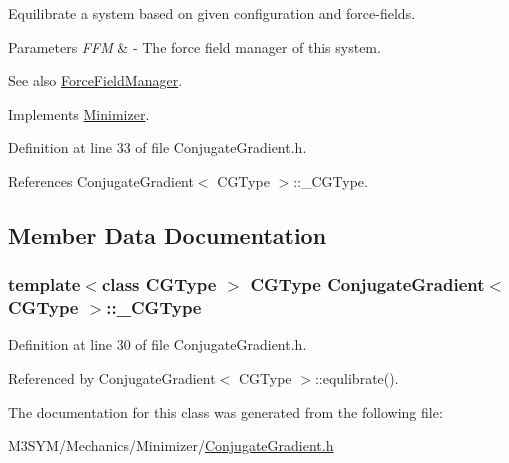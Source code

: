 Equilibrate a system based on given configuration and force-\/fields. 


\begin{DoxyParams}{Parameters}
{\em F\+F\+M} & -\/ The force field manager of this system. \\
\hline
\end{DoxyParams}
\begin{DoxySeeAlso}{See also}
\hyperlink{classForceFieldManager}{Force\+Field\+Manager}. 
\end{DoxySeeAlso}


Implements \hyperlink{classMinimizer_ae7a86f3d2c59c646b3c8d3381ac95ac4}{Minimizer}.



Definition at line 33 of file Conjugate\+Gradient.\+h.



References Conjugate\+Gradient$<$ C\+G\+Type $>$\+::\+\_\+\+C\+G\+Type.



\subsection{Member Data Documentation}
\hypertarget{classConjugateGradient_a9e3c6e755ad09adc3ee4d2dafe0917d3}{
\subsubsection[{\+\_\+\+C\+G\+Type}]{\setlength{\rightskip}{0pt plus 5cm}template$<$class C\+G\+Type $>$ C\+G\+Type {\bf Conjugate\+Gradient}$<$ C\+G\+Type $>$\+::\+\_\+\+C\+G\+Type\hspace{0.3cm}{\ttfamily [private]}}}\label{classConjugateGradient_a9e3c6e755ad09adc3ee4d2dafe0917d3}


Definition at line 30 of file Conjugate\+Gradient.\+h.



Referenced by Conjugate\+Gradient$<$ C\+G\+Type $>$\+::equlibrate().



The documentation for this class was generated from the following file\+:\begin{DoxyCompactItemize}
\item 
M3\+S\+Y\+M/\+Mechanics/\+Minimizer/\hyperlink{ConjugateGradient_8h}{Conjugate\+Gradient.\+h}\end{DoxyCompactItemize}
